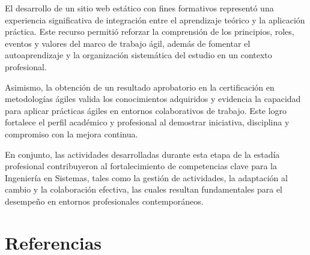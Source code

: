 \documentclass[12pt]{article}
\begin{document}
El desarrollo de un sitio web estático con fines formativos representó una experiencia significativa de integración entre el aprendizaje teórico y la aplicación práctica. Este recurso permitió reforzar la comprensión de los principios, roles, eventos y valores del marco de trabajo ágil, además de fomentar el autoaprendizaje y la organización sistemática del estudio en un contexto profesional.

Asimismo, la obtención de un resultado aprobatorio en la certificación en metodologías ágiles valida los conocimientos adquiridos y evidencia la capacidad para aplicar prácticas ágiles en entornos colaborativos de trabajo. Este logro fortalece el perfil académico y profesional al demostrar iniciativa, disciplina y compromiso con la mejora continua.

En conjunto, las actividades desarrolladas durante esta etapa de la estadía profesional contribuyeron al fortalecimiento de competencias clave para la Ingeniería en Sistemas, tales como la gestión de actividades, la adaptación al cambio y la colaboración efectiva, las cuales resultan fundamentales para el desempeño en entornos profesionales contemporáneos.



\section*{Referencias}
\end{document}
